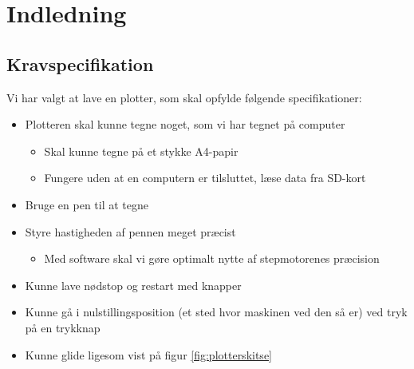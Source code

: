 \chapter{Indledning}


\lipsum

\lipsum

\section{Kravspecifikation}

Vi har valgt at lave en plotter, som skal opfylde følgende specifikationer:
\begin{itemize}
\item Plotteren skal kunne tegne noget, som vi har tegnet på computer
\begin{itemize}
\item Skal kunne tegne på et stykke A4-papir
\item Fungere uden at en computern er tilsluttet, læse data fra SD-kort
\end{itemize}
\item Bruge en pen til at tegne
\item Styre hastigheden af pennen meget præcist
\begin{itemize}
\item Med software skal vi gøre optimalt nytte af stepmotorenes præcision
\end{itemize}
\item Kunne lave nødstop og restart med knapper
\item Kunne gå i nulstillingsposition (et sted hvor maskinen ved den så er) ved tryk på en trykknap
\item Kunne glide ligesom vist på figur \vref{fig:plotterskitse}
\end{itemize}
